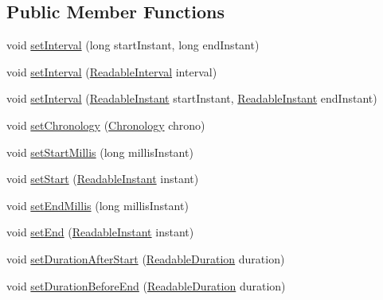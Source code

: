 \subsection*{Public Member Functions}
\begin{DoxyCompactItemize}
\item 
void \hyperlink{interfaceorg_1_1joda_1_1time_1_1_read_writable_interval_a18c83f934e51d8d5d993857dcf1f6214}{set\-Interval} (long start\-Instant, long end\-Instant)
\item 
void \hyperlink{interfaceorg_1_1joda_1_1time_1_1_read_writable_interval_a854554ae764de9ae4b9d87cf1ed68b6d}{set\-Interval} (\hyperlink{interfaceorg_1_1joda_1_1time_1_1_readable_interval}{Readable\-Interval} interval)
\item 
void \hyperlink{interfaceorg_1_1joda_1_1time_1_1_read_writable_interval_a020a2c99f391e69a51d9e8f496000978}{set\-Interval} (\hyperlink{interfaceorg_1_1joda_1_1time_1_1_readable_instant}{Readable\-Instant} start\-Instant, \hyperlink{interfaceorg_1_1joda_1_1time_1_1_readable_instant}{Readable\-Instant} end\-Instant)
\item 
void \hyperlink{interfaceorg_1_1joda_1_1time_1_1_read_writable_interval_a9297c7e514beac28ef51180da854a3da}{set\-Chronology} (\hyperlink{classorg_1_1joda_1_1time_1_1_chronology}{Chronology} chrono)
\item 
void \hyperlink{interfaceorg_1_1joda_1_1time_1_1_read_writable_interval_ad8ae2ca8302ef3f2dc0e96336c120fe6}{set\-Start\-Millis} (long millis\-Instant)
\item 
void \hyperlink{interfaceorg_1_1joda_1_1time_1_1_read_writable_interval_add3eadbb384e93d91a1ef026753b4bf8}{set\-Start} (\hyperlink{interfaceorg_1_1joda_1_1time_1_1_readable_instant}{Readable\-Instant} instant)
\item 
void \hyperlink{interfaceorg_1_1joda_1_1time_1_1_read_writable_interval_a29d4a5d3a41a1060ee960579a6c50915}{set\-End\-Millis} (long millis\-Instant)
\item 
void \hyperlink{interfaceorg_1_1joda_1_1time_1_1_read_writable_interval_a378f967fa1c8ef32f2f98436e4b92459}{set\-End} (\hyperlink{interfaceorg_1_1joda_1_1time_1_1_readable_instant}{Readable\-Instant} instant)
\item 
void \hyperlink{interfaceorg_1_1joda_1_1time_1_1_read_writable_interval_a7adab84dd3572ce24a46be380bfcbc64}{set\-Duration\-After\-Start} (\hyperlink{interfaceorg_1_1joda_1_1time_1_1_readable_duration}{Readable\-Duration} duration)
\item 
void \hyperlink{interfaceorg_1_1joda_1_1time_1_1_read_writable_interval_adfeb09e3273f74a98a81e31ee02185cf}{set\-Duration\-Before\-End} (\hyperlink{interfaceorg_1_1joda_1_1time_1_1_readable_duration}{Readable\-Duration} duration)

\end{DoxyCompactItemize}
